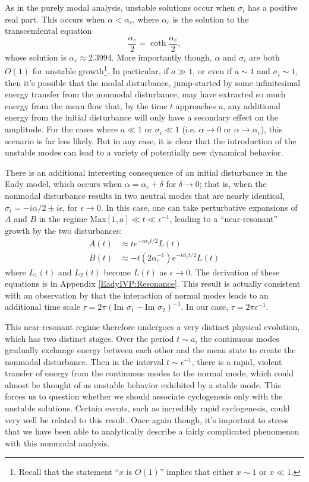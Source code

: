 \documentclass[letterpaper,11pt,onecolumn,twoside,titlepage]{article}
\begin{document}
As in the purely modal analysis, unstable solutions occur when $\sigma_i$ has a positive real part. This occurs when $\alpha < \alpha_c$, where $\alpha_c$ is the solution to the transcendental equation
\[
\frac{\alpha_c}{2} = \coth \frac{\alpha_c}{2},
\]
whose solution is $\alpha_c \approx 2.3994$. More importantly though, $\alpha$ and $\sigma_i$ are both $O(1)$ for unstable growth\footnote{Recall that the statement ``$x \text{ is } O(1)$'' implies that either $x \sim 1$ or $x \ll 1$.}. In particular, if $a \gg 1$, or even if $a \sim 1$ and $\sigma_i \sim 1$, then it's possible that the modal disturbance, jump-started by some infinitesimal energy transfer from the nonmodal disturbance, may have extracted so much energy from the mean flow that, by the time $t$ approaches $a$, any additional energy from the initial disturbance will only have a secondary effect on the amplitude. For the cases where $a \ll 1$ or $\sigma_i \ll 1$ (i.e. $\alpha \rightarrow 0$ or $\alpha \rightarrow \alpha_c$), this scenario is far less likely. But in any case, it is clear that the introduction of the unstable modes can lead to a variety of potentially new dynamical behavior.

There is an additional interesting consequence of an initial disturbance in the Eady model, which occurs when $\alpha = \alpha_c + \delta$ for $\delta \rightarrow 0$; that is, when the nonmodal disturbance results in two neutral modes that are nearly identical, $\sigma_i = -i\alpha/2 \pm i\epsilon$, for $\epsilon \rightarrow 0$. In this case, one can take perturbative expansions of $A$ and $B$ in the regime $\text{Max}[1,a] \ll t \ll \epsilon^{-1}$, leading to a ``near-resonant'' growth by the two disturbances:
\begin{align}
A(t) &\approx t e^{-i \alpha_c t / 2} L(t) \\
B(t) &\approx -t \left(2 \alpha_c^{-1}\right) e^{-i \alpha_c t / 2} L(t)
\end{align} 
where $L_1(t)$ and $L_2(t)$ become $L(t)$ as $\epsilon \rightarrow 0$. The derivation of these equations is in Appendix \ref{EadyIVP:Resonance}. This result is actually consistent with an observation by \citet{Lindzen+:1982} that the interaction of normal modes leads to an additional time scale $\tau = 2\pi (\text{Im } \sigma_1 - \text{Im } \sigma_2)^{-1}$. In our case, $\tau = 2 \pi \epsilon^{-1}$.

This near-resonant regime therefore undergoes a very distinct physical evolution, which has two distinct stages. Over the period $t \sim a$, the continuous modes gradually exchange energy between each other and the mean state to create the nonmodal disturbance. Then in the interval $t \sim \epsilon^{-1}$, there is a rapid, violent transfer of energy from the continuous modes to the normal mode, which could almost be thought of as unstable behavior exhibited by a stable mode. This forces us to question whether we should associate cyclogenesis only with the unstable solutions. Certain events, such as incredibly rapid cyclogenesis, could very well be related to this result. Once again though, it's important to stress that we have been able to analytically describe a fairly complicated phenomenon with this nonmodal analysis.
\end{document}
